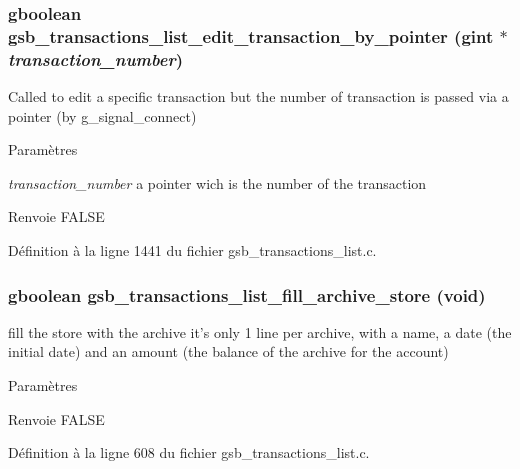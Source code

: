 \subsubsection[{gsb\_\-transactions\_\-list\_\-edit\_\-transaction\_\-by\_\-pointer}]{\setlength{\rightskip}{0pt plus 5cm}gboolean gsb\_\-transactions\_\-list\_\-edit\_\-transaction\_\-by\_\-pointer (gint $\ast$ {\em transaction\_\-number})}\label{gsb__transactions__list_8c_a586edcd7d904b6fd75ab87544f8609fa}
Called to edit a specific transaction but the number of transaction is passed via a pointer (by g\_\-signal\_\-connect)


\begin{DoxyParams}{Paramètres}
\item[{\em transaction\_\-number}]a pointer wich is the number of the transaction\end{DoxyParams}
\begin{DoxyReturn}{Renvoie}
FALSE 
\end{DoxyReturn}


Définition à la ligne 1441 du fichier gsb\_\-transactions\_\-list.c.

\subsubsection[{gsb\_\-transactions\_\-list\_\-fill\_\-archive\_\-store}]{\setlength{\rightskip}{0pt plus 5cm}gboolean gsb\_\-transactions\_\-list\_\-fill\_\-archive\_\-store (void)}\label{gsb__transactions__list_8c_a1a818af14b9c3c740d85b2c76cae24d5}
fill the store with the archive it's only 1 line per archive, with a name, a date (the initial date) and an amount (the balance of the archive for the account)


\begin{DoxyParams}{Paramètres}
\item[{\em }]\end{DoxyParams}
\begin{DoxyReturn}{Renvoie}
FALSE 
\end{DoxyReturn}


Définition à la ligne 608 du fichier gsb\_\-transactions\_\-list.c.

